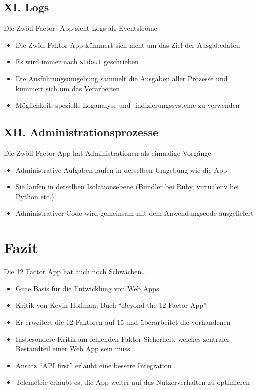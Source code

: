 \documentclass[fleqn,10pt]{SelfArx} %
\begin{document}
\subsection{XI. Logs}
Die Zwölf-Factor -App sieht Logs als Eventströme
\begin{itemize}
	\item Die Zwölf-Faktor-App kümmert sich nicht um das Ziel der Ausgabedaten
	\item Es wird immer nach \texttt{stdout} geschrieben
	\item Die Ausführungsumgebung sammelt die Ausgaben aller Prozesse und kümmert sich um das Verarbeiten
	\item Möglichkeit, spezielle Loganalyse und -indizierungssysteme zu verwenden
\end{itemize}
\subsection{XII. Administrationsprozesse}
Die Zwölf-Factor-App hat Administrationen als einmalige Vorgänge
\begin{itemize}
	\item Administrative Aufgaben laufen in derselben Umgebung wie die App
	\item Sie laufen in derselben Isolationsebene (Bundler bei Ruby, virtualenv bei Python etc.)
	\item Administrativer Code wird gemeinsam mit dem Anwendungscode ausgeliefert
\end{itemize}
\section{Fazit}
Die 12 Factor App hat auch noch Schwächen\ldots
	\begin{itemize}
	\item Gute Basis für die Entwicklung von Web Apps
	\item Kritik von Kevin Hoffman, Buch \enquote{Beyond the 12 Factor App}~\cite{beyond}
	\item Er erweitert die 12 Faktoren auf 15 und überarbeitet die vorhandenen
	\item Insbesondere Kritik am fehlenden Faktor Sicherheit, welches zentraler Bestandteil einer Web App sein muss
	\item Ansatz \enquote{API first} erlaubt eine bessere Integration
	\item Telemetrie erlaubt es, die App weiter auf das Nutzerverhalten zu optimieren
\end{itemize}
\end{document}
